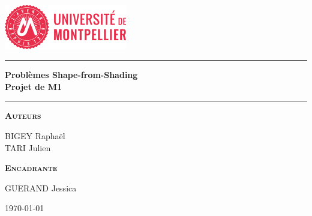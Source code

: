 \begin{titlepage}
\begin{center}
\vspace{2cm}
\includegraphics[width=0.4\textwidth]{./Images/UM1.png}~\\[1cm]
\vspace{2cm}

\hrule
\vspace{.5cm}
{\huge\bfseries{Problèmes Shape-from-Shading\\Projet de M1}} %
\vspace{.5cm}

\hrule
\vspace{1.5cm}

\textsc{\textbf{Auteurs}}\\
\vspace{.5cm}
\centering

BIGEY Raphaël \\
TARI Julien


\vspace{1cm}

\textsc{\textbf{Encadrante}}\\
\vspace{.5cm}
\centering

GUERAND Jessica
\vspace{4cm}

\centering \today %
\end{center}
\end{titlepage}